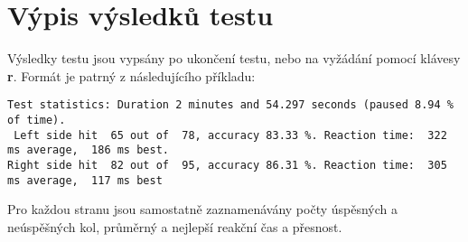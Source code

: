 \documentclass[twoside]{article}
\begin{document}
\section{Výpis výsledků testu}
Výsledky testu jsou vypsány po ukončení testu, nebo na vyžádání pomocí klávesy \textbf{r}. Formát je patrný z následujícího příkladu:
\begin{lstlisting}
Test statistics: Duration 2 minutes and 54.297 seconds (paused 8.94 % of time).
 Left side hit  65 out of  78, accuracy 83.33 %. Reaction time:  322 ms average,  186 ms best.
Right side hit  82 out of  95, accuracy 86.31 %. Reaction time:  305 ms average,  117 ms best
\end{lstlisting}

Pro každou stranu jsou samostatně zaznamenávány počty úspěsných a neúspěšných kol, průměrný a nejlepší reakční čas a přesnost.
\end{document}

